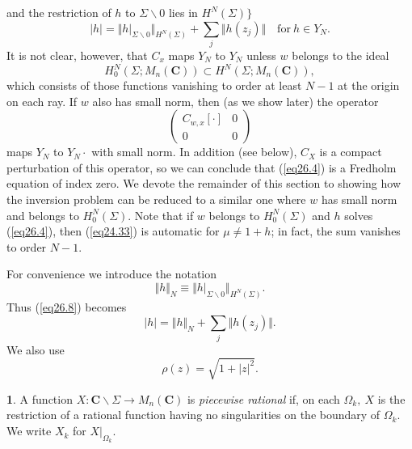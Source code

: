 \documentclass{surv-l}
\theoremstyle{plain}
\theoremstyle{definition}
\newtheorem{definition}[theorem]{\sc{Definition}}
\numberwithin{equation}{chapter}
\begin{document}
\hfill and the restriction of $h$ to $\Sigma\backslash 0$ lies in $H^{N}(\Sigma)\}$
\begin{equation}\label{eq26.8}
|h|=\Vert h|_{\Sigma\backslash 0}\Vert_{{H^{N}}(\Sigma)}+ \sum_{j}\Vert h(z_{j})\Vert\quad \mathrm{for}\ h\in Y_{N}.
\end{equation}
It is not clear, however, that $C_{x}$ maps $Y_{N}$ to $Y_{N}$ unless $w$ belongs to the ideal
\begin{equation}\label{eq26.9}
H_{0}^{N}(\Sigma; M_{n}(\mathbf{C}))\subset H^{N}(\Sigma;M_{n}(\mathbf{C})),
\end{equation}
which consists of those functions vanishing to order at least $N-1$ at the origin on each ray. If $w$ also has small norm, then (as we show later) the operator
\begin{equation*}
\left(\begin{array}{cc}
C_{w,x}[\cdot] & 0\\
0 & 0
\end{array}\right)
\end{equation*}
maps $Y_{N}$ to $Y_{N}\cdot$ with small norm. In addition (see below), $C_{X}$ is a compact perturbation of this operator, so we can conclude that (\ref{eq26.4}) is a Fredholm equation of index zero. We devote the remainder of this section to showing how the inversion problem can be reduced to a similar one where $w$ has small norm and belongs to $H_{0}^{N}(\Sigma)$. Note that if $w$ belongs to $H_{0}^{N}(\Sigma)$ and $h$ solves (\ref{eq26.4}), then (\ref{eq24.33}) is automatic for $\mu\neq 1+h$; in fact, the sum vanishes to order $N-1$.

For convenience we introduce the notation
\begin{equation}\label{eq26.10}
\Vert h\Vert_{N}\equiv\Vert h|_{\Sigma\backslash 0}\Vert_{{H^{N}}(\Sigma)}.
\end{equation}
Thus (\ref{eq26.8}) becomes
\begin{equation*}
|h|=\Vert h\Vert_{N}+\sum_{j}\Vert h(z_{j})\Vert.
\end{equation*}
We also use
\begin{equation}\label{eq26.11}
\rho(z)=\sqrt{1+|z|^{2}}.
\end{equation}
\setcounter{theorem}{11}
\begin{definition}\label{defi26.12}
A function $X:\mathbf{C}\backslash \Sigma\rightarrow M_{n}(\mathbf{C})$ is \emph{piecewise rational} if, on each $\Omega_{k},\ X$ is the restriction of a rational function having no singularities on the boundary of $\Omega_{k}$. We write $X_{k}$ for $X|_{\Omega_{k}}$.
\end{definition}
\end{document}
